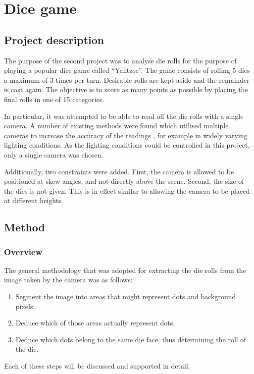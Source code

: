 \chapter {Dice game}
\section{Project description}

The purpose of the second project was to analyse die rolls for the purpose of playing a popular dice game called ``Yahtzee''. The game consists of rolling 5 dies a maximum of 3 times per turn. Desirable rolls are kept aside and the remainder is cast again. The objective is to score as many points as possible by placing the final rolls in one of 15 categories. 

In particular, it was attempted to be able to read off the die rolls with a single camera. A number of existing methods were found which utilised multiple cameras to increase the accuracy of the readings \cite{hsu2012color}, for example in widely varying lighting conditions. As the lighting conditions could be controlled in this project, only a single camera was chosen. 

Additionally, two constraints were added. First, the camera is allowed to be positioned at skew angles, and not directly above the scene. Second, the size of the dies is not given. This is in effect similar to allowing the camera to be placed at different heights.

\section{Method}
\subsection{Overview}
The general methodology that was adopted for extracting the die rolls from the image taken by the camera was as follows:
\begin{enumerate}
\item Segment the image into areas that might represent dots and background pixels.
\item Deduce which of those areas actually represent dots.
\item Deduce which dots belong to the same die face, thus determining the roll of the die.
\end{enumerate}

Each of these steps will be discussed and supported in detail.


